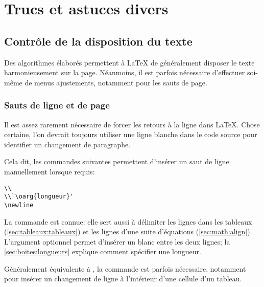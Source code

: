 \chapter{Trucs et astuces divers}
\label{chap:trucs}


\section{Contrôle de la disposition du texte}
\label{sec:trucs:controle}

Des algorithmes élaborés permettent à {\LaTeX} de généralement
disposer le texte harmonieusement sur la page. Néanmoins, il
est parfois nécessaire  d'effectuer soi-même de menus ajustements,
notamment pour les sauts de page.

\subsection{Sauts de ligne et de page}
\label{sec:trucs:controle:sauts}

Il est assez rarement nécessaire de forcer les retours à la ligne dans
{\LaTeX}. Chose certaine, l'on devrait toujours utiliser une ligne
blanche dans le code source pour identifier un changement de
paragraphe.

Cela dit, les commandes suivantes permettent d'insérer un saut de
ligne manuellement lorsque requis:
\begin{lstlisting}
\\
\\`\oarg{longueur}'
\newline
\end{lstlisting}
La commande \cmd{\\} est connue: elle sert aussi à délimiter les
lignes dans les tableaux (\autoref{sec:tableaux:tableaux}) et les lignes
d'une suite d'équations (\autoref{sec:math:align}). L'argument optionnel
 permet d'insérer un blanc entre les deux lignes; la
\autoref{sec:boites:longueurs} explique comment spécifier une
longueur.

Généralement équivalente à {\bs\bs}, la commande \cmd{\newline} est
parfois nécessaire, notamment pour insérer un changement de ligne à
l'intérieur d'une cellule d'un tableau.

